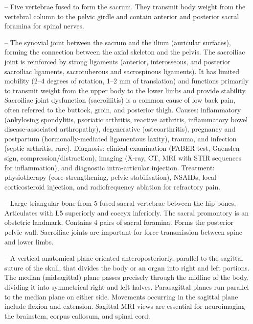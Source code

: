-- Five vertebrae fused to form the sacrum. They transmit body weight from the vertebral column to the pelvic girdle and contain anterior and posterior sacral foramina for spinal nerves.

-- The synovial joint between the sacrum and the ilium (auricular surfaces), forming the connection between the axial skeleton and the pelvis. The sacroiliac joint is reinforced by strong ligaments (anterior, interosseous, and posterior sacroiliac ligaments, sacrotuberous and sacrospinous ligaments). It has limited mobility (2--4 degrees of rotation, 1--2 mm of translation) and functions primarily to transmit weight from the upper body to the lower limbs and provide stability. Sacroiliac joint dysfunction (sacroiliitis) is a common cause of low back pain, often referred to the buttock, groin, and posterior thigh. Causes: inflammatory (ankylosing spondylitis, psoriatic arthritis, reactive arthritis, inflammatory bowel disease-associated arthropathy), degenerative (osteoarthritis), pregnancy and postpartum (hormonally-mediated ligamentous laxity), trauma, and infection (septic arthritis, rare). Diagnosis: clinical examination (FABER test, Gaenslen sign, compression/distraction), imaging (X-ray, CT, MRI with STIR sequences for inflammation), and diagnostic intra-articular injection. Treatment: physiotherapy (core strengthening, pelvic stabilisation), NSAIDs, local corticosteroid injection, and radiofrequency ablation for refractory pain.

-- Large triangular bone from 5 fused sacral vertebrae between the hip bones. Articulates with L5 superiorly and coccyx inferiorly. The sacral promontory is an obstetric landmark. Contains 4 pairs of sacral foramina. Forms the posterior pelvic wall. Sacroiliac joints are important for force transmission between spine and lower limbs.

-- A vertical anatomical plane oriented anteroposteriorly, parallel to the sagittal suture of the skull, that divides the body or an organ into right and left portions. The median (midsagittal) plane passes precisely through the midline of the body, dividing it into symmetrical right and left halves. Parasagittal planes run parallel to the median plane on either side. Movements occurring in the sagittal plane include flexion and extension. Sagittal MRI views are essential for neuroimaging the brainstem, corpus callosum, and spinal cord.

